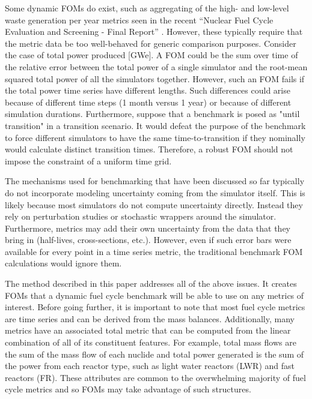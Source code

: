Some dynamic FOMs do exist, such as aggregating of the high- and low-level
waste generation per year metrics seen in the recent 
``Nuclear Fuel Cycle Evaluation and Screening - Final Report'' 
\cite{wigeland2014nuclear}. However, these typically require that the metric
data be too well-behaved for generic comparison purposes. Consider the case 
of total power produced [GWe]. A FOM could be the sum over time of the relative error 
between the total power of a single simulator and the root-mean squared total power
of all the simulators together. However, such an FOM fails if the total power
time series have different lengths. Such differences could arise because 
of different time steps (1 month versus 1 year) or because of different 
simulation durations. Furthermore, suppose that a benchmark is posed as 
"until transition" in a transition scenario. It would defeat the purpose of 
the benchmark to force different simulators to have the same 
time-to-transition if they nominally would calculate distinct transition 
times. Therefore, a robust FOM should not impose the constraint of a uniform time grid.
 
The mechanisms used for benchmarking that have been discussed so far typically
do not incorporate modeling uncertainty coming from the simulator itself.
This is likely because most simulators do not compute uncertainty directly. 
Instead they rely on perturbation studies or stochastic wrappers around 
the simulator. Furthermore, metrics may add their own uncertainty from the 
data that they bring in (half-lives, cross-sections, etc.). 
However, even if such error bars were available for
every point in a time series metric, the traditional benchmark FOM 
calculations would ignore them.

The method described in this paper addresses all of the above issues. It 
creates FOMs that a dynamic fuel cycle benchmark will be able to use on any 
metrics of interest. Before going further, it is important to note that 
most fuel cycle 
metrics are time series and can be derived from the mass balances. 
Additionally, many metrics have an associated total metric that can be 
computed from the linear combination of all of its constituent features. 
For example, total mass flows are the sum of the mass flow of each nuclide
and total power generated is the sum of the power from each reactor type, 
such as light water reactors (LWR) and fast reactors (FR). These attributes 
are common to the overwhelming majority of fuel cycle metrics and so FOMs
may take advantage of such structures.

